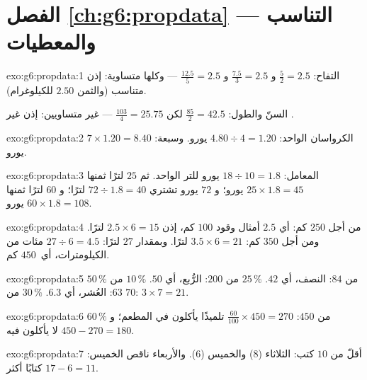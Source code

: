 \section*{الفصل \ref{ch:g6:propdata} --- التناسب والمعطيات}

\begin{solution}{exo:g6:propdata:1}
التفاح:  $\frac52 = 2.5$ و $\frac{7.5}{3} = 2.5$ و
$\frac{12.5}{5} = 2.5$ --- وكلها متساوية: إذن متناسب (والثمن
$2.50$ للكيلوغرام).

السنّ والطول: $\frac{85}{2} = 42.5$ لكن $\frac{103}{4} = 25.75$ --- غير
متساويين: إذن غير .
\end{solution}

\begin{solution}{exo:g6:propdata:2}
الكرواسان الواحد: $4.80 \div 4 = 1.20$ يورو. وسبعة:
$7 \times 1.20 = 8.40$ يورو.
\end{solution}

\begin{solution}{exo:g6:propdata:3}
المعامل: $18 \div 10 = 1.8$ يورو للتر الواحد. ثم
$25$ لترًا ثمنها $25 \times 1.8 = 45$ يورو؛ و $72$ يورو تشتري
$72 \div 1.8 = 40$ لترًا؛ و $60$ لترًا ثمنها $60 \times 1.8 = 108$ يورو.
\end{solution}

\begin{solution}{exo:g6:propdata:4}
من أجل $250$ كم: أي $2.5$ أمثال وقود $100$ كم، إذن
$2.5 \times 6 = 15$ لترًا. ومن أجل $350$ كم: $3.5 \times 6 = 21$ لترًا. وبمقدار
$27$ لترًا: $27 \div 6 = 4.5$ مئات من الكيلومترات، أي\ $450$ كم.
\end{solution}

\begin{solution}{exo:g6:propdata:5}
$50\,\%$ من $84$: النصف، أي $42$. \quad
$25\,\%$ من $200$: الرُّبع، أي $50$. \quad
$10\,\%$ من $63$: العُشر، أي $6.3$. \quad
$30\,\%$ من $70$: $3 \times 7 = 21$.
\end{solution}

\begin{solution}{exo:g6:propdata:6}
$60\,\%$ من $450$: $\frac{60}{100} \times 450 = 270$ تلميذًا يأكلون في
المطعم؛ و $450 - 270 = 180$ لا يأكلون فيه.
\end{solution}

\begin{solution}{exo:g6:propdata:7}
أقلّ من $10$ كتب: الثلاثاء ($8$) والخميس ($6$). والأربعاء
ناقص الخميس: $17 - 6 = 11$ كتابًا أكثر.
\end{solution}

